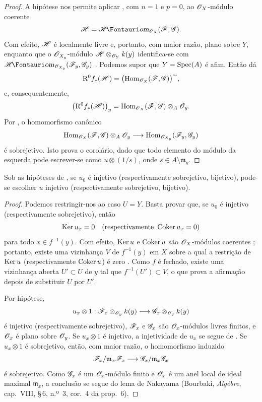 \begin{proof}
A hipótese nos permite aplicar , com $n=1$
e $p=0$, ao $\mathscr{O}_X$-módulo coerente
\[
  \sh{H}=\shHom_{\sh{O}_X}(\sh{F},\sh{G}).
\]
Com efeito, $\mathscr{H}$ é localmente livre e, portanto, com maior razão, plano sobre
$Y$, enquanto que o $\mathscr{O}_{X_y}$-módulo
$\mathscr{H}\otimes_{\mathscr{O}_Y}k(y)$ identifica-se com
$\shHom_{\sh{O}_{X_y}}(\sh{F}_y,\sh{G}_y)$
. Podemos supor que $Y=\operatorname{Spec}(A)$ é afim.
Então  dá
\[
  \mathrm{R}^0f_*(\mathscr{H})
  =
  \bigl(\operatorname{Hom}_{\mathscr{O}_X}(\mathscr{F},\mathscr{G})\bigr)^{\sim},
\]
e, consequentemente,
\[
  \bigl(\mathrm{R}^0f_*(\mathscr{H})\bigr)_y
  =
  \operatorname{Hom}_{\mathscr{O}_X}(\mathscr{F},\mathscr{G})
    \otimes_A\mathscr{O}_y.
\]
Por , o homomorfismo canônico
\[
  \operatorname{Hom}_{\mathscr{O}_X}(\mathscr{F},\mathscr{G})
    \otimes_A\mathscr{O}_y
  \longrightarrow
  \operatorname{Hom}_{\mathscr{O}_{X_y}}(\mathscr{F}_y,\mathscr{G}_y)
\]
é sobrejetivo. Isto prova o corolário, dado que todo elemento do
módulo da esquerda pode escrever-se como $u\otimes(1/s)$, onde
$s\in A\setminus\mathfrak m_y$.
\end{proof}

\begin{corollary}[4.6.3]
\label{III.4.6.3}
Sob as hipóteses de , se $u_0$ é injetivo
(respectivamente sobrejetivo, bijetivo), pode-se escolher $u$
injetivo (respectivamente sobrejetivo, bijetivo).
\end{corollary}

\begin{proof}
Podemos restringir-nos ao caso $U=Y$. Basta provar
que, se $u_0$ é injetivo (respectivamente sobrejetivo), então
\[
  \operatorname{Ker} u_x=0
  \quad\text{(respectivamente }\operatorname{Coker} u_x=0\text{)}
\]
para todo $x\in f^{-1}(y)$. Com efeito, $\operatorname{Ker} u$ e $\operatorname{Coker} u$ são
$\mathscr{O}_X$-módulos coerentes ; portanto, existe uma
vizinhança $V$ de $f^{-1}(y)$ em $X$ sobre a qual a restrição de
$\operatorname{Ker} u$ (respectivamente $\operatorname{Coker} u$) é zero .
Como $f$ é fechado, existe uma vizinhança aberta
$U'\subset U$ de $y$ tal que $f^{-1}(U')\subset V$, o que prova
a afirmação depois de substituir $U$ por $U'$.


Por hipótese,
\[
  u_x\otimes1:
  \mathscr{F}_x\otimes_{\mathscr{O}_y}k(y)
  \longrightarrow
  \mathscr{G}_x\otimes_{\mathscr{O}_y}k(y)
\]
é injetivo (respectivamente sobrejetivo), $\mathscr{F}_x$ e $\mathscr{G}_x$
são $\mathscr{O}_x$-módulos livres finitos, e $\mathscr{O}_x$ é plano sobre
$\mathscr{O}_y$. Se $u_x\otimes1$ é injetivo, a injetividade de $u_x$
se segue de . Se $u_x\otimes1$ é sobrejetivo,
então, com maior razão, o homomorfismo induzido
\[
  \mathscr{F}_x/\mathfrak m_x\mathscr{F}_x
  \longrightarrow
  \mathscr{G}_x/\mathfrak m_x\mathscr{G}_x
\]
é sobrejetivo. Como $\mathscr{G}_x$ é um $\mathscr{O}_x$-módulo finito e
$\mathscr{O}_x$ é um anel local de ideal maximal $\mathfrak m_x$, a
conclusão se segue do lema de Nakayama (Bourbaki,
\emph{Alg\`ebre}, cap.~VIII, \S\,6, n.º~3, cor.~4 da prop.~6).
\end{proof}

